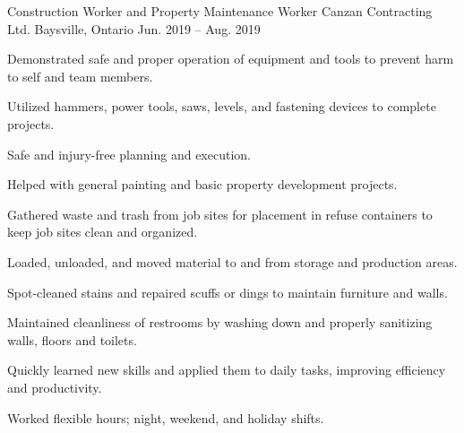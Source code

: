 \begin{cventries}
  \cventry
    {Construction Worker and Property Maintenance Worker} %
    {Canzan Contracting Ltd.} %
    {Baysville, Ontario} %
    {Jun. 2019 -- Aug. 2019} %
    {
      \begin{cvitems} %
        \item {Demonstrated safe and proper operation of equipment and tools to prevent harm to self and team members.}
        \item {Utilized hammers, power tools, saws, levels, and fastening devices to complete projects.}
        \item {Safe and injury-free planning and execution.}
        \item {Helped with general painting and basic property development projects.}
        \item {Gathered waste and trash from job sites for placement in refuse containers to keep job sites clean and organized.}
        \item {Loaded, unloaded, and moved material to and from storage and production areas.}
        \item {Spot-cleaned stains and repaired scuffs or dings to maintain furniture and walls.}
        \item {Maintained cleanliness of restrooms by washing down and properly sanitizing walls, floors and toilets.}
        \item {Quickly learned new skills and applied them to daily tasks, improving efficiency and productivity.}
        \item {Worked flexible hours; night, weekend, and holiday shifts.}
      \end{cvitems}
    }
\end{cventries}
